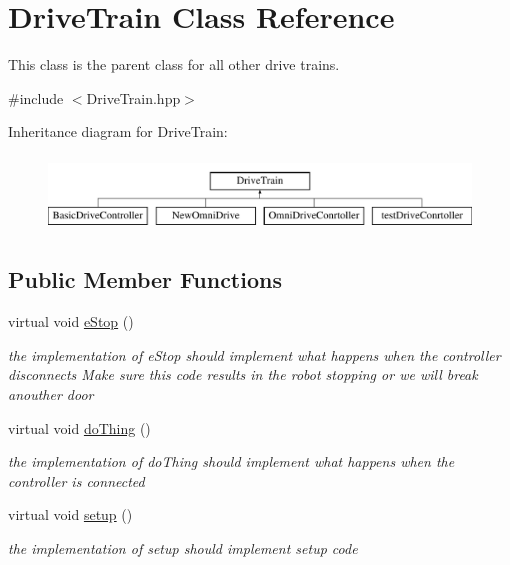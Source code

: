 \hypertarget{class_drive_train}{}\section{Drive\+Train Class Reference}
\label{class_drive_train}


This class is the parent class for all other drive trains.  




{\ttfamily \#include $<$Drive\+Train.\+hpp$>$}

Inheritance diagram for Drive\+Train\+:\begin{figure}[H]
\begin{center}
\leavevmode
\includegraphics[height=2.000000cm]{class_drive_train}
\end{center}
\end{figure}
\subsection*{Public Member Functions}
\begin{DoxyCompactItemize}
\item 
\mbox{\label{class_drive_train_ab56f1f7c0f20792e999ef85c374fc2dd}} 
virtual void \mbox{\hyperlink{class_drive_train_ab56f1f7c0f20792e999ef85c374fc2dd}{e\+Stop}} ()
\begin{DoxyCompactList}\small\item\em the implementation of e\+Stop should implement what happens when the controller disconnects Make sure this code results in the robot stopping or we will break anouther door \end{DoxyCompactList}\item 
\mbox{\label{class_drive_train_a3bfe7aec9ea012b074df4cd6e76d0a03}} 
virtual void \mbox{\hyperlink{class_drive_train_a3bfe7aec9ea012b074df4cd6e76d0a03}{do\+Thing}} ()
\begin{DoxyCompactList}\small\item\em the implementation of do\+Thing should implement what happens when the controller is connected \end{DoxyCompactList}\item 
\mbox{\label{class_drive_train_aa931301c0de26dddf04236dd539ab1df}} 
virtual void \mbox{\hyperlink{class_drive_train_aa931301c0de26dddf04236dd539ab1df}{setup}} ()
\begin{DoxyCompactList}\small\item\em the implementation of setup should implement setup code \end{DoxyCompactList}\end{DoxyCompactItemize}


